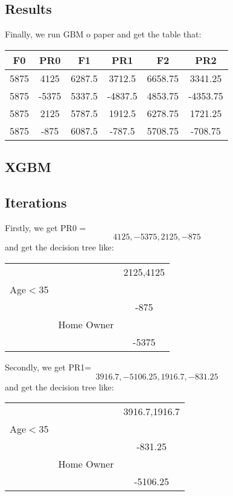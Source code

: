 \documentclass[a4paper,12pt]{journal}
\begin{document}
	\subsection*{Results}
	Finally, we run GBM o paper and get the table that:
	\begin{center}
		\begin{tabular}{|c|c|c|c|c|c|}
			\hline
			F0&PR0&F1&PR1&F2&PR2\\\hline
			5875&4125&6287.5&3712.5&6658.75&3341.25\\\hline
			5875&-5375&5337.5&-4837.5&4853.75&-4353.75\\\hline
			5875&2125&5787.5&1912.5&6278.75&1721.25\\\hline
			5875&-875&6087.5&-787.5&5708.75&-708.75\\\hline
		\end{tabular}
	\end{center}
	\subsection*{XGBM}
		\subsection*{Iterations}
	Firstly, we get PR0 = \[4125,-5375,2125,-875\] and get the decision tree like:
	\begin{center}
		\begin{tabular}{c c c}
			&&2125,4125\\
			Age$<$35&&\\
			&&-875\\
			&Home Owner&\\
			&&-5375\\
		\end{tabular}
	\end{center}
	Secondly, we get PR1=\[3916.7,-5106.25,1916.7,-831.25\] and get the decision tree like:
	\begin{center}
		\begin{tabular}{c c c}
			&&3916.7,1916.7\\
			Age$<$35&&\\
			&&-831.25\\
			&Home Owner&\\
			&&-5106.25\\
		\end{tabular}
	\end{center}
\end{document}
